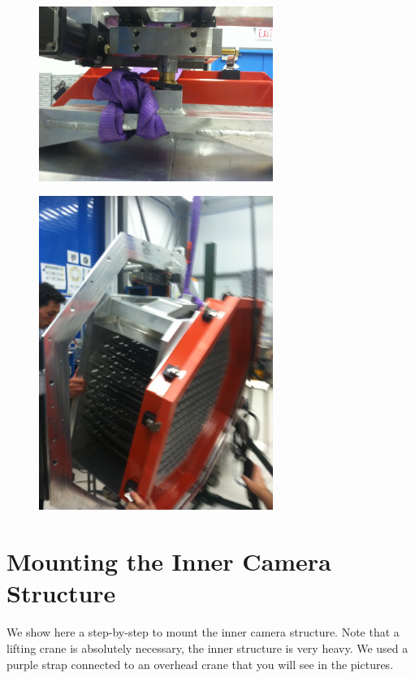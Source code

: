 \documentclass[11pt]{article}
\begin{document}
\begin{figure}[h]
\begin{center}
\includegraphics[width = 3in]{photo_2.png}
\end{center}
\caption{}  
\label{figRemove1}
\end{figure}


\begin{figure}[h]
\begin{center}
\includegraphics[width = 3in]{photo_3.png}
\end{center}
\caption{}  
\label{figRemove2}
\end{figure}


\section{Mounting the Inner Camera Structure}
We show here a step-by-step to mount the inner camera structure.  
Note that a lifting crane is absolutely necessary, the inner structure is very heavy.
We used a purple strap connected to an overhead crane that you will see in the pictures.
\end{document}
